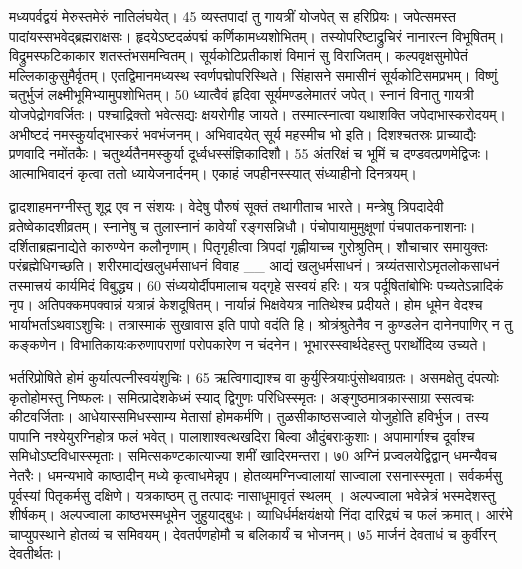 मध्यपर्वद्वयं मेरुस्तमेरुं नातिलंघयेत्।
45 व्यस्तपादां तु गायत्रीं योजपेत् स हरिप्रियः।
 जपेत्समस्त पादांयस्सभवेद्ब्रह्मराक्षसः।
 हृदयेऽष्टदळंपद्मं कर्णिकामध्यशोभितम्।
 तस्योपरिष्टाद्रुचिरं नानारत्न विभूषितम्।
 विद्रुमस्फटिकाकार शतस्तंभसमन्वितम्।
 सूर्यकोटिप्रतीकाशं विमानं सु विराजितम्।
 कल्पवृक्षसुमोपेतं मल्लिकाकुसुमैर्वृतम्।
 एतद्विमानमध्यस्थ स्वर्णपद्मोपरिस्थिते।
 सिंहासने समासीनं सूर्यकोटिसमप्रभम्।
 विष्णुं चतुर्भुजं लक्ष्मीभूमिभ्यामुपशोभितम्।
 50 ध्यात्वैवं हृदिवा सूर्यमण्डलेमातरं जपेत्।
 स्नानं विनातु गायत्री योजपेद्रोगवर्जितः।
 पश्चाद्रिक्तो भवेत्सद्यः क्षयरोगीह जायते।
 तस्मात्स्नात्वा यथाशक्ति जपेदाभास्करोदयम्।
 अभीष्टदं नमस्कुर्याद्भास्करं भवभंजनम्।
 अभिवादयेत् सूर्य महस्मीच भो इति।
 दिशश्चतस्रः प्राच्याद्यैः प्रणवादि नमोंतकैः।
 चतुर्थ्यतैनमस्कुर्या दूर्ध्वधस्संज्ञिकादिशौ।
 55 अंतरिक्षं च भूमिं च दण्डवत्प्रणमेद्विजः।
 आत्माभिवादनं कृत्वा ततो ध्यायेजनार्दनम्।
 एकाहं जपहीनस्स्यात् संध्याहीनो दिनत्रयम्।
 
द्वादशाहमनग्नीस्तु शूद्र एव न संशयः।
 वेदेषु पौरुषं सूक्तं तथागीताच भारते।
 मन्त्रेषु त्रिपदादेवी व्रतेष्वेकादशीव्रतम्।
 स्नानेषु च तुलास्नानं कावेर्यां रङ्गसन्निधौ।
 पंचोपायामुमुक्षूणां पंचपातकनाशनाः।
 दर्शिताब्रह्मनाद्येते कारुण्येन कलौनृणाम्।
 पितृगृहीत्वा त्रिपदां गृह्णीयाच्च गुरोश्रुतिम्।
 शौचाचार समायुक्तः परंब्रह्मेधिगच्छति।
 शरीरमाद्यंखलुधर्मसाधनं विवाह
__ आद्यं खलुधर्मसाधनं।
 त्रय्यंतसारोऽमृतलोकसाधनं तस्मात्त्रयं
कार्यमिदं विबुद्ध्य।
 60 संध्ययोर्दीपमालाच यद्गृहे सस्वयं हरिः।
 यत्र पर्दूषितांबोभिः पच्यतेऽन्नादिकं नृप।
 अतिपक्कमपक्वान्नं यत्रान्नं केशदूषितम्।
 नार्यान्नं भिक्षवेयत्र नातिथेश्च प्रदीयते।
 होम धूमेन वेदश्च भार्याभर्ताऽथवाऽशुचिः।
 तत्रास्माकं सुखावास इति पापो वदंति हि।
 श्रोत्रंश्रुतेनैव न कुण्डलेन
दानेनपाणिर् न तु कङ्कणेन।
 विभातिकायःकरुणापराणां परोपकारेण न चंदनेन।
 भूभारस्स्वार्थदेहस्तु परार्थोदिव्य उच्यते।
 
भर्तरिप्रोषिते होमं कुर्यात्पत्नीस्वयंशुचिः।
65 ऋत्विगाद्याश्च वा कुर्युस्त्रियाःपुंसोथवाग्रतः।
 असमक्षेतु दंपत्योः कृतोहोमस्तु निष्फलः।
 समित्प्रादेशकेध्मं स्याद् द्विगुणः परिधिस्स्मृतः।
 अङ्गुष्ठमात्रकास्साग्रा स्सत्वचः कीटवर्जिताः।
 आधेयास्समिधस्साम्य मेतासां होमकर्मणि।
 तुळसीकाष्ठसज्वाले योजुहोति हविर्भुज।
 तस्य पापानि नश्येयुरग्निहोत्र फलं भवेत्।
 पालाशाश्वत्थखदिरा बिल्वा औदुंबराःकुशाः।
 अपामार्गाश्च दूर्वाश्च समिधोऽष्टविधास्स्मृताः।
 समित्सकण्टकात्याज्या शमीं खादिरमन्तरा।
 ७0 अग्निं प्रज्वलयेद्विद्वान् धमन्यैवच नेतरैः।
 धमन्यभावे काष्ठादीन् मध्ये कृत्वाधमेन्नृप।
 होतव्यमग्निज्वालायां साज्वाला रसनास्स्मृता।
 सर्वकर्मसु पूर्वस्यां पितृकर्मसु दक्षिणे।
 यत्रकाष्ठम् तु तत्पादः नासाधूमावृतं स्थलम् ।
 अल्पज्वाला भवेन्नेत्रं भस्मदेशस्तु शीर्षकम्।
 अल्पज्वाला काष्ठभस्मधूमेन जुहुयाद्बुधः।
 व्याधिर्धर्मक्षयंक्षयो निंदा दारिद्र्यं च फलं क्रमात्।
 आरंभे चाप्युपस्थाने होतव्यं च समिवयम्।
 देवतर्पणहोमौ च बलिकार्यं च भोजनम्।
 ७5 मार्जनं देवताधं च कुर्वीरन् देवतीर्थतः।

